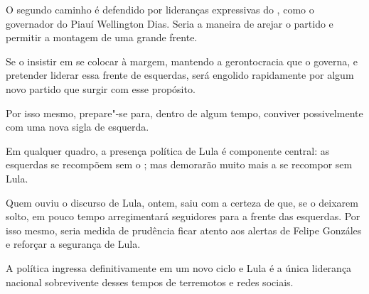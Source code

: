 O segundo caminho é defendido por lideranças expressivas do , como o
governador do Piauí Wellington Dias. Seria a maneira de arejar o partido
e permitir a montagem de uma grande frente.

Se o  insistir em se colocar à margem, mantendo a gerontocracia que o
governa, e pretender liderar essa frente de esquerdas, será engolido
rapidamente por algum novo partido que surgir com esse propósito.

Por isso mesmo, prepare"-se para, dentro de algum tempo, conviver
possivelmente com uma nova sigla de esquerda.

Em qualquer quadro, a presença política de Lula é componente central: as
esquerdas se recompõem sem o ; mas demorarão muito mais a se recompor
sem Lula.

Quem ouviu o discurso de Lula, ontem, saiu com a certeza de que, se o
deixarem solto, em pouco tempo arregimentará seguidores para a frente
das esquerdas. Por isso mesmo, seria medida de prudência ficar atento
aos alertas de Felipe Gonzáles e reforçar a segurança de Lula.

A política ingressa definitivamente em um novo ciclo e Lula é a única
liderança nacional sobrevivente desses tempos de terremotos e redes
sociais.
